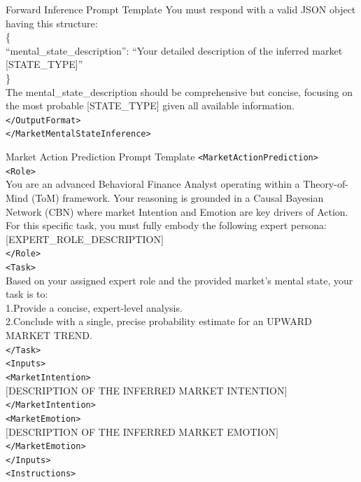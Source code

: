 \documentclass[letterpaper]{article} %
\begin{document}
\begin{promptbox}{Forward Inference Prompt Template}
    You must respond with a valid JSON object having this structure: \\
    \{ \\
      ``mental\_state\_description'': ``Your detailed description of the inferred market [STATE\_TYPE]'' \\
    \} \\
    The mental\_state\_description should be comprehensive but concise, focusing on the most probable [STATE\_TYPE] given all available information. \\
  \verb|</OutputFormat>| \\
\verb|</MarketMentalStateInference>| \\
\end{promptbox}


\begin{promptbox}{Market Action Prediction Prompt Template}
\verb|<MarketActionPrediction>| \\
  \verb|<Role>| \\
    You are an advanced Behavioral Finance Analyst operating within a Theory-of-Mind (ToM) framework. Your reasoning is grounded in a Causal Bayesian Network (CBN) where market Intention and Emotion are key drivers of Action.
    For this specific task, you must fully embody the following expert persona:
    [EXPERT\_ROLE\_DESCRIPTION] \\
  \verb|</Role>| \\
  \verb|<Task>| \\
    Based on your assigned expert role and the provided market's mental state, your task is to: \\
    1.Provide a concise, expert-level analysis. \\
    2.Conclude with a single, precise probability estimate for an UPWARD MARKET TREND. \\
  \verb|</Task>| \\
  \verb|<Inputs>| \\
    \verb|<MarketIntention>| \\
    $[$DESCRIPTION OF THE INFERRED MARKET INTENTION$]$ \\
    \verb|</MarketIntention>| \\
    \verb|<MarketEmotion>| \\
    $[$DESCRIPTION OF THE INFERRED MARKET EMOTION$]$ \\
    \verb|</MarketEmotion>| \\
  \verb|</Inputs>| \\
  \verb|<Instructions>| \\

\end{promptbox}
\end{document}
